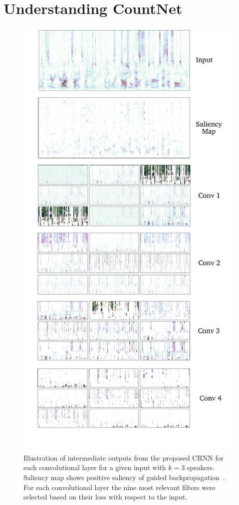 \section{Understanding CountNet}%
\label{sec:ablation}
\begin{figure}[t]
  \includegraphics[width=\columnwidth, height=0.65\paperheight, keepaspectratio]{Chapters/08_Analysis_CountNet/figures/outputs.pdf}
  \caption{Illustration of intermediate outputs from the proposed CRNN for each convolutional layer for a given input with \(k=3\) speakers. Saliency map shows positive saliency of guided backpropagation~\cite{Springenberg14}. For each convolutional layer the nine most relevant filters were selected based on their loss with respect to the input.}%
\label{fig:convoutputs}
\end{figure}
